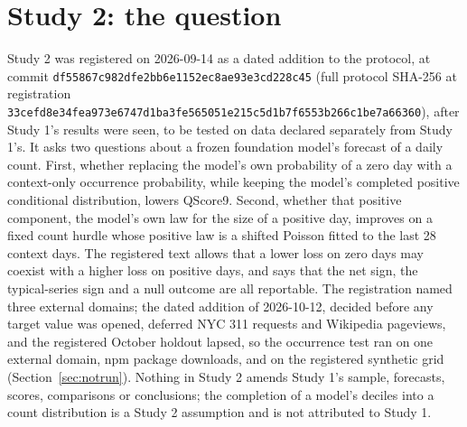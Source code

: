 \providecommand{\lm}{\texttt{local\_mean\_28}}
\providecommand{\qs}{QScore9}
\providecommand{\hc}{\texttt{hurdle\_count\_28}}

\section{Study 2: the question}
\label{sec:s2question}

Study 2 was registered on 2026-09-14 as a dated addition to the protocol, at commit
\texttt{df55867c982dfe2bb6e1152ec8ae93e3cd228c45} (full protocol SHA-256 at registration
\texttt{33cefd8e34fea973e6747d1ba3fe565051e215c5d1b7f6553b266c1be7a66360}), after Study 1's results were
seen, to be tested on data declared separately from Study 1's. It asks two questions about a frozen foundation
model's forecast of a daily count. First, whether replacing the model's own probability of a zero day with a
context-only occurrence probability, while keeping the model's completed positive conditional distribution,
lowers \qs{}. Second, whether that positive component, the model's own law for the size of a positive day,
improves on a fixed count hurdle whose positive law is a shifted Poisson fitted to the last 28 context days.
The registered text allows that a lower loss on zero days may coexist with a higher loss on positive days,
and says that the net sign, the typical-series sign and a null outcome are all reportable. The registration
named three external domains; the dated addition of 2026-10-12, decided before any target value was opened,
deferred NYC 311 requests and Wikipedia pageviews, and the registered October holdout lapsed, so the
occurrence test ran on one external domain, npm package downloads, and on the registered synthetic grid
(Section~\ref{sec:notrun}). Nothing in Study 2 amends Study 1's sample, forecasts, scores, comparisons or
conclusions; the completion of a model's deciles into a count distribution is a Study 2 assumption and is
not attributed to Study 1.

